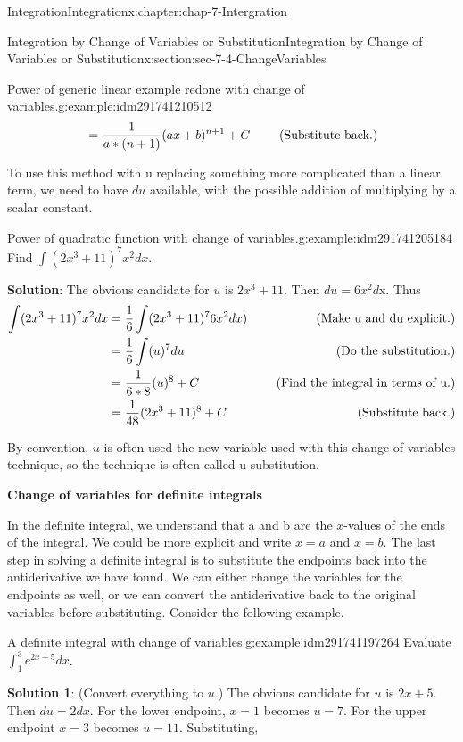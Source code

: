 \documentclass[oneside,10pt,]{book}
\newcommand{\terminology}[1]{\textbf{#1}}
\numberwithin{equation}{section}
\newcommand{\amp}{&}
\begin{document}
\begin{chapterptx}{Integration}{}{Integration}{}{}{x:chapter:chap-7-Intergration}
\begin{sectionptx}{Integration by Change of Variables or Substitution}{}{Integration by Change of Variables or Substitution}{}{}{x:section:sec-7-4-ChangeVariables}
\begin{example}{Power of generic linear example redone with change of variables.}{g:example:idm291741210512}
\begin{equation*}
\begin{aligned}
\amp =\frac{1}{a*(n+1)} (ax+b)^{n+1}+C
\amp \quad \hbox{ (Substitute back.)}\\ 
\end{aligned}
\end{equation*}
\end{example}
To use this method with u replacing something more complicated than a linear term, we need to have \(du\) available, with the possible addition of multiplying by a scalar constant.%
\begin{example}{Power of quadratic function with change of variables.}{g:example:idm291741205184}%
Find \(\int (2x^3+11)^7 x^2 dx\).%
\par
\terminology{Solution}:  The obvious candidate for \(u\) is \(2x^3+11\).  Then \(du=6x^2d\)x.  Thus%
%
\begin{equation*}
\begin{aligned}  \int (2x^3+11)^7 x^2 dx
\amp =\frac{1}{6} \int (2x^3+11)^7 6x^2 dx)
\amp \quad \hbox{ (Make u and du explicit.)}\\ 
\amp =\frac{1}{6} \int (u)^7  du
\amp \quad \hbox{ (Do the substitution.)}\\ 
\amp =\frac{1}{6*8} (u)^8+C
\amp \quad \hbox{ (Find the integral in terms of u.)}\\ 
\amp =\frac{1}{48} (2x^3+11)^8+C
\amp \quad \hbox{ (Substitute back.)}\\ 
\end{aligned}
\end{equation*}
\end{example}
By convention, \(u\) is often used the new variable used with this change of variables technique, so the technique is often called u-substitution.%
\par
\terminology{Change of variables for definite integrals}%
\par
In the definite integral, we understand that a and b are the \(x\)-values of the ends of the integral.  We could be more explicit and write \(x=a\) and \(x=b\).  The last step in solving a definite integral is to substitute the endpoints back into the antiderivative we have found.  We can either change the variables for the endpoints as well, or we can convert the antiderivative back to the original variables before substituting.  Consider the following example.%
\begin{example}{A definite integral with change of variables.}{g:example:idm291741197264}%
Evaluate \(\int_1^3 e^{2x+5} dx\).%
\par
\terminology{Solution 1}:  (Convert everything to \(u\).) The obvious candidate for \(u\) is \(2x+5\).  Then    \(du=2dx\).  For the lower endpoint, \(x=1\) becomes \(u=7\).  For the upper endpoint \(x=3\) becomes \(u=11\).  Substituting,%

\end{example}
\end{sectionptx}
\end{chapterptx}
\end{document}
